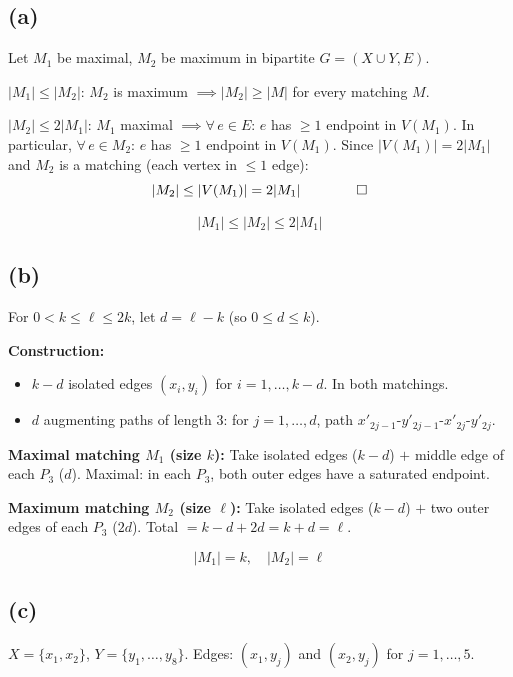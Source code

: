 \documentclass[11pt]{article}
\begin{document}
\vspace{-10pt}
\subsection*{(a)}

Let $M_1$ be maximal, $M_2$ be maximum in bipartite $G = (X \cup Y, E)$.

$|M_1| \le |M_2|$: $M_2$ is maximum $\implies |M_2| \ge |M|$ for every matching $M$.

$|M_2| \le 2|M_1|$: $M_1$ maximal $\implies \forall\, e \in E$: $e$ has $\ge 1$ endpoint in $V(M_1)$. In particular, $\forall\, e \in M_2$: $e$ has $\ge 1$ endpoint in $V(M_1)$. Since $|V(M_1)| = 2|M_1|$ and $M_2$ is a matching (each vertex in $\le 1$ edge):
\[
|M_2| \le |V(M_1)| = 2|M_1| \qquad \qed
\]

\[\boxed{|M_1| \le |M_2| \le 2|M_1|}\]

\vspace{-20pt}
\subsection*{(b)}

For $0 < k \le \ell \le 2k$, let $d = \ell - k$ (so $0 \le d \le k$).

\textbf{Construction:}
\begin{itemize}[leftmargin=*,itemsep=2pt]
\item $k - d$ isolated edges $(x_i, y_i)$ for $i = 1, \ldots, k{-}d$. In both matchings.
\item $d$ augmenting paths of length $3$: for $j = 1, \ldots, d$, path $x'_{2j-1}$-$y'_{2j-1}$-$x'_{2j}$-$y'_{2j}$.
\end{itemize}

\textbf{Maximal matching $M_1$ (size $k$):} Take isolated edges ($k{-}d$) $+$ middle edge of each $P_3$ ($d$). Maximal: in each $P_3$, both outer edges have a saturated endpoint.

\textbf{Maximum matching $M_2$ (size $\ell$):} Take isolated edges ($k{-}d$) $+$ two outer edges of each $P_3$ ($2d$). Total $= k - d + 2d = k + d = \ell$.

\[\boxed{|M_1| = k, \quad |M_2| = \ell}\]

\vspace{-20pt}
\subsection*{(c)}

$X = \{x_1, x_2\}$, $Y = \{y_1, \ldots, y_8\}$. Edges: $(x_1, y_j)$ and $(x_2, y_j)$ for $j = 1, \ldots, 5$.
\end{document}
